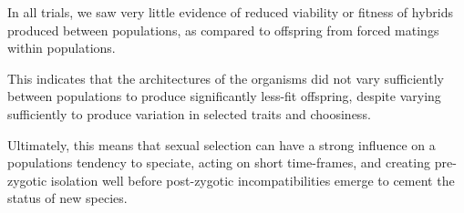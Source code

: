 In all trials, we saw very little evidence of reduced viability or fitness of hybrids produced between populations, as compared to offspring from forced matings within populations.

This indicates that the architectures of the organisms did not vary sufficiently between populations to produce significantly less-fit offspring, despite varying sufficiently to produce variation in selected traits and choosiness.

Ultimately, this means that sexual selection can have a strong influence on a populations tendency to speciate, acting on short time-frames, and creating pre-zygotic isolation well before post-zygotic incompatibilities emerge to cement the status of new species.